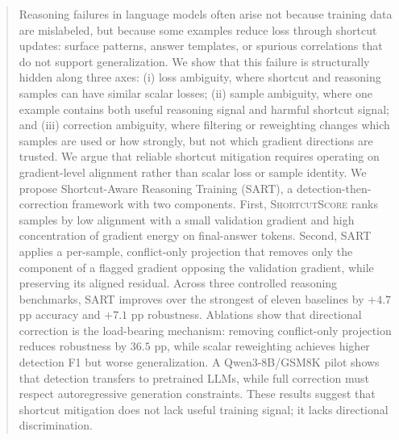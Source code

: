 \begin{abstract}
Reasoning failures in language models often arise not because training data are mislabeled, but because some examples reduce loss through shortcut updates: surface patterns, answer templates, or spurious correlations that do not support generalization. We show that this failure is structurally hidden along three axes: (i) loss ambiguity, where shortcut and reasoning samples can have similar scalar losses; (ii) sample ambiguity, where one example contains both useful reasoning signal and harmful shortcut signal; and (iii) correction ambiguity, where filtering or reweighting changes which samples are used or how strongly, but not which gradient directions are trusted. We argue that reliable shortcut mitigation requires operating on gradient-level alignment rather than scalar loss or sample identity.
We propose Shortcut-Aware Reasoning Training (SART), a detection-then-correction framework with two components. First, \textsc{ShortcutScore} ranks samples by low alignment with a small validation gradient and high concentration of gradient energy on final-answer tokens. Second, SART applies a per-sample, conflict-only projection that removes only the component of a flagged gradient opposing the validation gradient, while preserving its aligned residual. Across three controlled reasoning benchmarks, SART improves over the strongest of eleven baselines by $+4.7$ pp accuracy and $+7.1$ pp robustness. Ablations show that directional correction is the load-bearing mechanism: removing conflict-only projection reduces robustness by $36.5$ pp, while scalar reweighting achieves higher detection F1 but worse generalization. A Qwen3-8B/GSM8K pilot shows that detection transfers to pretrained LLMs, while full correction must respect autoregressive generation constraints. These results suggest that shortcut mitigation does not lack useful training signal; it lacks directional discrimination.
\end{abstract}
